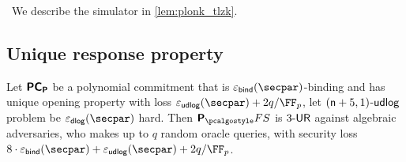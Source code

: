 \ 
We describe the simulator in \cref{lem:plonk_tlzk}.

\subsection{Unique response property}
\begin{lemma}
	\label{lem:plonkprot_ur}
	Let $\bm{\mathsf{PC}}_{\bm{\mathsf{P}}}$ be a polynomial commitment that is $\epsbind(\secpar)$-binding and has unique opening property with loss $\epsudlog (\secpar) + 2 \infrac{q}{\FF_p}$, let $(\mathsf{n} + 5, 1)$-$\mathsf{udlog}$ problem be $\epsdlog (\secpar)$ hard. Then $\plonkprotfs$ is ${3\text{-}\mathsf{UR}}$ against algebraic adversaries, who makes up to $q$ random oracle queries, with security loss $8  \cdot \epsbinding (\secpar) + \epsudlog (\secpar) + 2 \infrac{q}{\FF_p}$.
\end{lemma}
